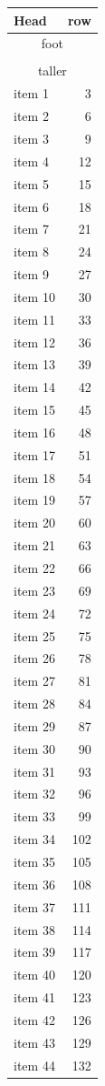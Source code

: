 \documentclass{article}
\begin{document}
\begin{longtable}[r]{lr}
Head & row \\
\endhead
\multicolumn{2}{c}{foot} \\
\endfoot
\multicolumn{2}{c}{last foot} \\[6pt]
\multicolumn{2}{c}{taller} \\
\endlastfoot
item 1 & 3 \\
item 2 & 6 \\
item 3 & 9 \\
item 4 & 12 \\
item 5 & 15 \\
item 6 & 18 \\
item 7 & 21 \\
item 8 & 24 \\
item 9 & 27 \\
item 10 & 30 \\
item 11 & 33 \\
item 12 & 36 \\
item 13 & 39 \\
item 14 & 42 \\
item 15 & 45 \\
item 16 & 48 \\
item 17 & 51 \\
item 18 & 54 \\
item 19 & 57 \\
item 20 & 60 \\
item 21 & 63 \\
item 22 & 66 \\
item 23 & 69 \\
item 24 & 72 \\
item 25 & 75 \\
item 26 & 78 \\
item 27 & 81 \\
item 28 & 84 \\
item 29 & 87 \\
item 30 & 90 \\
item 31 & 93 \\
item 32 & 96 \\
item 33 & 99 \\
item 34 & 102 \\
item 35 & 105 \\
item 36 & 108 \\
item 37 & 111 \\
item 38 & 114 \\
item 39 & 117 \\
item 40 & 120 \\
item 41 & 123 \\
item 42 & 126 \\
item 43 & 129 \\
item 44 & 132 \\
\end{longtable}
\end{document}

